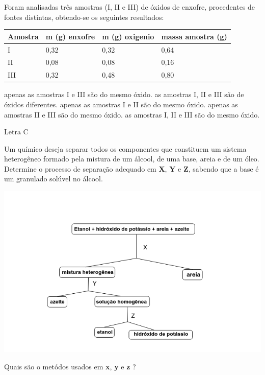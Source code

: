 \documentclass[11pt]{article}
\begin{document}
\begin{exercise}
Foram analisadas três amostras (I, II e III) de óxidos de enxofre, procedentes de fontes
distintas, obtendo-se os seguintes resultados:


\begin{center}
\begin{tabular}{llll}
\hline
Amostra & m (g) enxofre & m (g) oxigenio & massa amostra (g)\\
\hline
I & 0,32 & 0,32 & 0,64\\
II & 0,08 & 0,08 & 0,16\\
III & 0,32 & 0,48 & 0,80\\
\hline
\end{tabular}
\end{center}

\begin{choice}
\choice apenas as amostras I e III são do mesmo óxido.
\choice as amostras I, II e III são de óxidos diferentes.
\choice apenas as amostras I e II são do mesmo óxido.
\choice apenas as amostras II e III são do mesmo óxido.
\choice as amostras I, II e III são do mesmo óxido.
\end{choice}
\end{exercise}
\begin{solution}
Letra C
\end{solution}


\begin{exercise}
Um químico deseja separar todos os componentes que constituem um sistema heterogêneo formado pela mistura de um álcool, de uma base, areia e de um óleo. Determine o processo de separação adequado em \textbf{X}, \textbf{Y} e \textbf{Z}, sabendo que a base é um granulado solúvel no álcool.

\begin{center}
\includegraphics[scale=0.5]{../Listas/diagram-20230422.png}
\end{center}

Quais são o metódos usados em \textbf{x}, \textbf{y} e \textbf{z} ?


\blank[blank-style={\phantom{#1}},width=12\linewidth]{}
\end{exercise}
\end{document}
